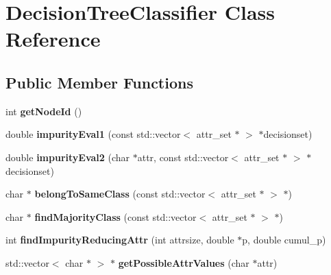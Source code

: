 \hypertarget{classDecisionTreeClassifier}{\section{Decision\-Tree\-Classifier Class Reference}
\label{classDecisionTreeClassifier}
}
\subsection*{Public Member Functions}
\begin{DoxyCompactItemize}
\item 
\hypertarget{classDecisionTreeClassifier_a4b548b17ae20833687eb552c5c0b34a4}{int {\bfseries get\-Node\-Id} ()}\label{classDecisionTreeClassifier_a4b548b17ae20833687eb552c5c0b34a4}

\item 
\hypertarget{classDecisionTreeClassifier_a88edc6ec85875411824275beb45c87ee}{double {\bfseries impurity\-Eval1} (const std\-::vector$<$ attr\-\_\-set $\ast$ $>$ $\ast$decisionset)}\label{classDecisionTreeClassifier_a88edc6ec85875411824275beb45c87ee}

\item 
\hypertarget{classDecisionTreeClassifier_a4086aa1e44f0e22584858a2c5b4f8b67}{double {\bfseries impurity\-Eval2} (char $\ast$attr, const std\-::vector$<$ attr\-\_\-set $\ast$ $>$ $\ast$decisionset)}\label{classDecisionTreeClassifier_a4086aa1e44f0e22584858a2c5b4f8b67}

\item 
\hypertarget{classDecisionTreeClassifier_a19313f2054baf46f1c5688a9f4dda45c}{char $\ast$ {\bfseries belong\-To\-Same\-Class} (const std\-::vector$<$ attr\-\_\-set $\ast$ $>$ $\ast$)}\label{classDecisionTreeClassifier_a19313f2054baf46f1c5688a9f4dda45c}

\item 
\hypertarget{classDecisionTreeClassifier_a4f1bf39d9c54e3d80c930e5d3a73683d}{char $\ast$ {\bfseries find\-Majority\-Class} (const std\-::vector$<$ attr\-\_\-set $\ast$ $>$ $\ast$)}\label{classDecisionTreeClassifier_a4f1bf39d9c54e3d80c930e5d3a73683d}

\item 
\hypertarget{classDecisionTreeClassifier_a42d4de7c57159425b3edc656df3eb2af}{int {\bfseries find\-Impurity\-Reducing\-Attr} (int attrsize, double $\ast$p, double cumul\-\_\-p)}\label{classDecisionTreeClassifier_a42d4de7c57159425b3edc656df3eb2af}

\item 
\hypertarget{classDecisionTreeClassifier_aafff32ee67beb13bd886cd3555b23fe7}{std\-::vector$<$ char $\ast$ $>$ $\ast$ {\bfseries get\-Possible\-Attr\-Values} (char $\ast$attr)}\label{classDecisionTreeClassifier_aafff32ee67beb13bd886cd3555b23fe7}


\end{DoxyCompactItemize}
